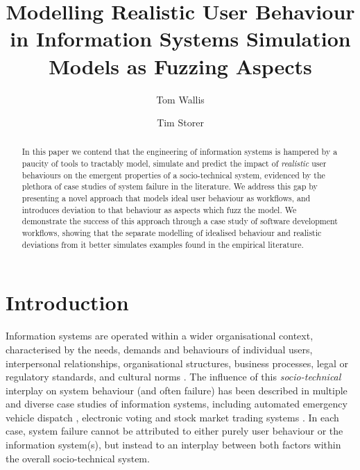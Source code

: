 \documentclass{llncs}
\title{Modelling Realistic User Behaviour in Information Systems Simulation Models as Fuzzing Aspects}
\author{Tom Wallis\orcidID{} \and Tim Storer\orcidID{}}
\institute{University of Glasgow, Glasgow, Scotland,\\
  \email{w.wallis.1@research.gla.ac.uk},\\
  \email{timothy.storer@glasgow.ac.uk},
}
\begin{document}

\maketitle


\begin{abstract}
  In this paper we contend that the engineering of information systems is hampered by a paucity of tools to tractably
  model, simulate and predict the impact of \emph{realistic} user behaviours on the emergent properties of
  a socio-technical system, evidenced by the plethora of case studies of system failure in the literature.  We
  address this gap by presenting a novel approach that models ideal user behaviour as workflows, and introduces
  deviation to that behaviour as aspects which fuzz the model. We demonstrate the success of this approach through a
  case study of software development workflows,  showing that the separate modelling of idealised behaviour and 
  realistic deviations from it better simulates examples found in the empirical literature.
\end{abstract}


\section{Introduction}
\label{sec:introduction}


Information systems are operated within a wider organisational context, characterised by the needs, demands and
behaviours of individual users, interpersonal relationships, organisational structures, business processes, legal or
regulatory standards, and cultural norms \citep{bade07structures,pentland05organisational}.  The influence of this
\emph{socio-technical} interplay on system behaviour (and often failure) has been described in multiple and diverse case
studies of information systems, including automated emergency vehicle dispatch \citep{robinson96limited}, electronic
voting \citep{lock07observations} and stock market trading systems \citep{cftc-sec10findings}. In each case, system
failure cannot be attributed to either purely user behaviour or the information system(s), but instead to an interplay
between both factors within the overall socio-technical system.
\end{document}
